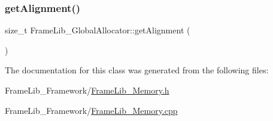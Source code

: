 \subsubsection{\texorpdfstring{get\+Alignment()}{getAlignment()}}
{\footnotesize\ttfamily size\+\_\+t Frame\+Lib\+\_\+\+Global\+Allocator\+::get\+Alignment (\begin{DoxyParamCaption}{ }\end{DoxyParamCaption})\hspace{0.3cm}{\ttfamily [static]}}



The documentation for this class was generated from the following files\+:\begin{DoxyCompactItemize}
\item 
Frame\+Lib\+\_\+\+Framework/\hyperlink{_frame_lib___memory_8h}{Frame\+Lib\+\_\+\+Memory.\+h}\item 
Frame\+Lib\+\_\+\+Framework/\hyperlink{_frame_lib___memory_8cpp}{Frame\+Lib\+\_\+\+Memory.\+cpp}\end{DoxyCompactItemize}
